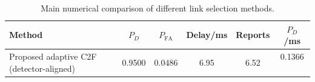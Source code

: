 \begin{table}[t]
    \centering
    \caption{Main numerical comparison of different link selection methods.}
    \label{tab:main_summary}
    \begin{tabular}{l c c c c c}
        \hline
        Method & $P_D$ & $P_{\mathrm{FA}}$ & Delay/ms & Reports & $P_D$/ms \\
        \hline
        Proposed adaptive C2F (detector-aligned) & 0.9500 & 0.0486 & 6.95 & 6.52 & 0.1366 \
        \hline
    \end{tabular}
\end{table}
